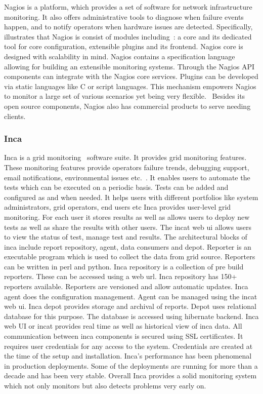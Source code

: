 {Nagios is a platform, which provides a set of software for network
infrastructure monitoring. It also offers administrative tools to
diagnose when failure events happen, and to notify operators when
hardware issues are detected. Specifically, illustrates that Nagios is
consist of modules including~\cite{nagios-book}: a core and its
dedicated tool for core configuration, extensible plugins and its
frontend. Nagios core is designed with scalability in mind.  Nagios
contains a specification language allowing for building an extensible
monitoring systems.  Through the Nagios API components can integrate
with the Nagios core services. Plugins can be developed via static
languages like C or script languages. This mechanism empowers Nagios
to monitor a large set of various scenarios yet being very
flexible.~\cite{nagios-paper-2012} Besides its open source components,
Nagios also has commercial products to serve needing clients.


\subsubsection{Inca \cv}

Inca is a grid monitoring~\cite{inca-book} software suite. It provides
grid monitoring features. These monitoring features provide operators
failure trends, debugging support, email notifications, environmental
issues etc.~\cite{www-inca}. It enables users to automate the tests
which can be executed on a periodic basis. Tests can be added and
configured as and when needed. It helps users with different
portfolios like system administrators, grid operators, end users etc
Inca provides user-level grid monitoring. For each user it stores
results as well as allows users to deploy new tests as well as share
the results with other users. The incat web ui allows users to view
the status of test, manage test and results. The architectural blocks
of inca include report repository, agent, data consumers and
depot. Reporter is an executable program which is used to collect the
data from grid source. Reporters can be written in perl and
python. Inca repository is a collection of pre build reporters.  These
can be accessed using a web url. Inca repository has 150+ reporters
available. Reporters are versioned and allow automatic updates. Inca
agent does the configuration management. Agent can be managed using
the incat web ui. Inca depot provides storage and archival of
reports. Depot uses relational database for this purpose. The database
is accessed using hibernate backend.  Inca web UI or incat provides
real time as well as historical view of inca data.  All communication
between inca components is secured using SSL certificates. It requires
user credentials for any access to the system. Credentials are created
at the time of the setup and installation. Inca's performance has been
phenomenal in production deployments. Some of the deployments are
running for more than a decade and has been very stable. Overall Inca
provides a solid monitoring system which not only monitors but also
detects problems very early on.

}
